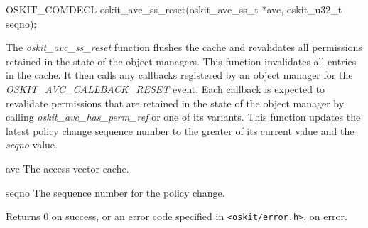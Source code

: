 \begin{apisyn}

	\funcproto OSKIT_COMDECL
	oskit_avc_ss_reset(oskit_avc_ss_t *avc, 
			 oskit_u32_t seqno);
\end{apisyn}
\begin{apidesc}

The \emph{oskit\_avc\_ss\_reset} function flushes the cache and revalidates
all permissions retained in the state of the object managers.  This
function invalidates all entries in the cache.  It then calls any
callbacks registered by an object manager for the
\emph{OSKIT\_AVC\_CALLBACK\_RESET} event.  Each callback is expected to
revalidate permissions that are retained in the state of
the object manager by calling \emph{oskit\_avc\_has\_perm\_ref} or one
of its variants.  This function updates the latest policy change
sequence number to the greater of its current value and the
\emph{seqno} value.

\end{apidesc}
\begin{apiparm}
	\item[avc]
		The access vector cache.
	\item[seqno]
		The sequence number for the policy change.
\end{apiparm}
\begin{apiret}
	Returns 0 on success, or an error code specified in
	{\tt <oskit/error.h>}, on error.
\end{apiret}


